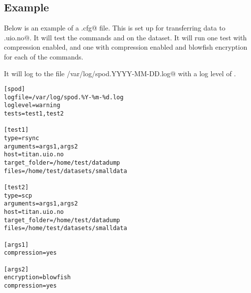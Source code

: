 \newpage
\subsection{Example}

Below is an example of a \verb@spodconf.cfg@ file. This is set up for
transferring data to \verb@titan.uio.no@. It will test the commands
\verb@rsync@ and \verb@scp@ on the \verb@smalldata@ dataset. It will run one
test with compression enabled, and one with compression enabled and blowfish
encryption for each of the commands. 

It will log to the file \verb@/var/log/spod.YYYY-MM-DD.log@ with a log level of
\verb@warning@.

\begin{verbatim}
[spod]
logfile=/var/log/spod.%Y-%m-%d.log
loglevel=warning
tests=test1,test2

[test1]
type=rsync
arguments=args1,args2
host=titan.uio.no
target_folder=/home/test/datadump
files=/home/test/datasets/smalldata

[test2]
type=scp
arguments=args1,args2
host=titan.uio.no
target_folder=/home/test/datadump
files=/home/test/datasets/smalldata

[args1]
compression=yes

[args2]
encryption=blowfish
compression=yes

\end{verbatim}
